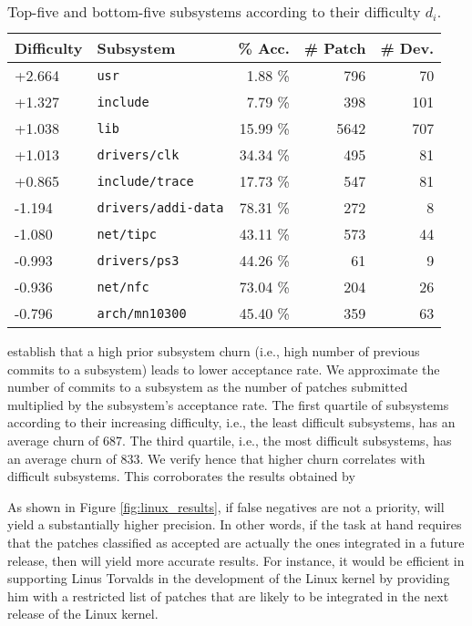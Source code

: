 \documentclass[format=sigconf]{acmart}
\newcommand{\interank}[1]{%
\ifthenelse{\isempty{#1}}{\textsc{interank}}{\textsc{interank} \emph{#1}}}
\begin{document}
\begin{table}
  \caption{Top-five and bottom-five subsystems according to their difficulty $d_i$.}
  \label{tab:linux_subsystems}
  \begin{tabular}{llrrr}
    \toprule
    Difficulty & Subsystem                  & \% Acc. & \# Patch & \# Dev.\\
    \midrule
    +2.664     & \texttt{usr}               & 1.88 \%  & 796      & 70 \\
    +1.327     & \texttt{include}           & 7.79 \%  & 398      & 101 \\
    +1.038     & \texttt{lib}               & 15.99 \% & 5642     & 707 \\
    +1.013     & \texttt{drivers/clk}       & 34.34 \% & 495      & 81 \\
    +0.865     & \texttt{include/trace}     & 17.73 \% & 547      & 81 \\
    \midrule
    -1.194     & \texttt{drivers/addi-data} & 78.31 \% & 272      & 8 \\
    -1.080     & \texttt{net/tipc}          & 43.11 \% & 573      & 44 \\
    -0.993     & \texttt{drivers/ps3}       & 44.26 \% & 61       & 9 \\
    -0.936     & \texttt{net/nfc}           & 73.04 \% & 204      & 26 \\
    -0.796     & \texttt{arch/mn10300}      & 45.40 \% & 359      & 63 \\
    \bottomrule
  \end{tabular}
\end{table}

\citet{jiang2013will} establish that a high prior subsystem churn (i.e., high number of previous commits to a subsystem) leads to lower acceptance rate.
We approximate the number of commits to a subsystem as the number of patches submitted multiplied by the subsystem's acceptance rate.
The first quartile of subsystems according to their increasing difficulty, i.e., the least difficult subsystems, has an average churn of \num{687}.
The third quartile, i.e., the most difficult subsystems, has an average churn of \num{833}.
We verify hence that higher churn correlates with difficult subsystems.
This corroborates the results obtained by \citeauthor{jiang2013will}

As shown in Figure \ref{fig:linux_results}, if false negatives are not a priority, \interank{} will yield a substantially higher precision.
In other words, if the task at hand requires that the patches classified as accepted are actually the ones integrated in a future release, then \interank{} will yield more accurate results.
For instance, it would be efficient in supporting Linus Torvalds in the development of the Linux kernel by providing him with a restricted list of patches that are likely to be integrated in the next release of the Linux kernel.
\end{document}
